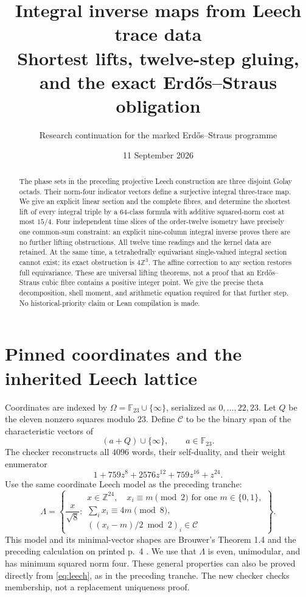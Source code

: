 \documentclass[11pt,reqno]{amsart}
\title[Integral Leech trace inverses]{Integral inverse maps from Leech trace data\\
Shortest lifts, twelve-step gluing, and the exact Erd\H{o}s--Straus obligation}
\author{Research continuation for the marked Erd\H{o}s--Straus programme}
\date{11 September 2026}
\theoremstyle{definition}\newtheorem{definition}[theorem]{Definition}
\theoremstyle{remark}\newtheorem{remark}[theorem]{Remark}
\newcommand{\Z}{\mathbb Z}\newcommand{\Q}{\mathbb Q}\newcommand{\R}{\mathbb R}\newcommand{\F}{\mathbb F}
\newcommand{\La}{\Lambda}\newcommand{\tr}{\operatorname{tr}}\newcommand{\Span}{\operatorname{span}}
\begin{document}
\begin{abstract}
The phase sets in the preceding projective Leech construction are three disjoint Golay octads. Their norm-four indicator vectors define a surjective integral three-trace map. We give an explicit linear section and the complete fibres, and determine the shortest lift of every integral triple by a 64-class formula with additive squared-norm cost at most $15/4$. Four independent time slices of the order-twelve isometry have precisely one common-sum constraint: an explicit nine-column integral inverse proves there are no further lifting obstructions. All twelve time readings and the kernel data are retained. At the same time, a tetrahedrally equivariant single-valued integral section cannot exist; its exact obstruction is $4\Z^3$. The affine correction to any section restores full equivariance. These are universal lifting theorems, not a proof that an Erd\H{o}s--Straus cubic fibre contains a positive integer point. We give the precise theta decomposition, shell moment, and arithmetic equation required for that further step. No historical-priority claim or Lean compilation is made.
\end{abstract}
\maketitle

\section{Pinned coordinates and the inherited Leech lattice}
Coordinates are indexed by $\Omega=\F_{23}\cup\{\infty\}$, serialized as $0,\ldots,22,23$. Let $Q$ be the eleven nonzero squares modulo $23$. Define $\mathcal C$ to be the binary span of the characteristic vectors of
\[
(a+Q)\cup\{\infty\},\qquad a\in\F_{23}.
\]
The checker reconstructs all $4096$ words, their self-duality, and their weight enumerator
\[
1+759z^8+2576z^{12}+759z^{16}+z^{24}.
\]
Use the same coordinate Leech model as the preceding tranche:
\begin{equation}\label{eq:leech}
\La=\left\{\frac{x}{\sqrt8}:\begin{array}{l}
x\in\Z^{24},\quad x_i\equiv m\pmod2\text{ for one }m\in\{0,1\},\\
\sum_i x_i\equiv4m\pmod8,\\
((x_i-m)/2\bmod2)_i\in\mathcal C
\end{array}\right\}.
\end{equation}
This model and its minimal-vector shapes are Brouwer's Theorem 1.4 and the preceding calculation on printed p.~4 \cite{Brouwer}. We use that $\La$ is even, unimodular, and has minimum squared norm four. These general properties can also be proved directly from \eqref{eq:leech}, as in the preceding tranche. The new checker checks membership, not a replacement uniqueness proof.
\end{document}
